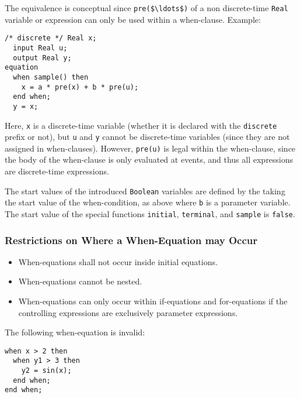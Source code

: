 \begin{nonnormative}
The equivalence is conceptual since \lstinline!pre($\ldots$)! of a non discrete-time \lstinline!Real! variable or expression can only be used within a when-clause.  Example:
\begin{lstlisting}[language=modelica]
  /* discrete */ Real x;
  input Real u;
  output Real y;
equation
  when sample() then
    x = a * pre(x) + b * pre(u);
  end when;
  y = x;
\end{lstlisting}

Here, \lstinline!x! is a discrete-time variable (whether it is declared with the \lstinline!discrete! prefix or not), but \lstinline!u! and \lstinline!y! cannot be discrete-time variables
(since they are not assigned in when-clauses).  However, \lstinline!pre(u)! is legal within the when-clause, since the body of the when-clause is only evaluated at events, and thus all expressions
are discrete-time expressions.
\end{nonnormative}

The start values of the introduced \lstinline!Boolean! variables are defined by the taking the start value of the when-condition, as above where \lstinline!b! is a parameter
variable.
The start value of the special functions \lstinline!initial!, \lstinline!terminal!, and \lstinline!sample! is \lstinline!false!.

\subsubsection{Restrictions on Where a When-Equation may Occur}\label{restrictions-on-where-a-when-equation-may-occur}
\begin{itemize}
\item
  When-equations shall not occur inside initial equations.
\item
  When-equations cannot be nested.
\item
  When-equations can only occur within if-equations and for-equations if
  the controlling expressions are exclusively parameter expressions.
\end{itemize}

\begin{example}
The following when-equation is invalid:
\begin{lstlisting}[language=modelica]
when x > 2 then
  when y1 > 3 then
    y2 = sin(x);
  end when;
end when;
\end{lstlisting}
\end{example}

